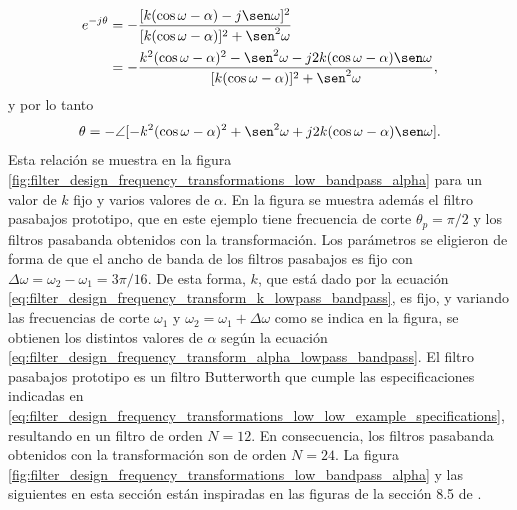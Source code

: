 \documentclass[a4paper]{report}
\begin{document}
\begin{align*}
 e^{-j\theta}&=-\frac{[k(\cos\omega-\alpha)-j\sen\omega]^2}{[k(\cos\omega-\alpha)]^2+\sen^2\omega}\\
  &=-\frac{k^2(\cos\omega-\alpha)^2-\sen^2\omega-j2k(\cos\omega-\alpha)\sen\omega}{[k(\cos\omega-\alpha)]^2+\sen^2\omega},
\end{align*}
y por lo tanto
\[
 \theta=-\angle[-k^2(\cos\omega-\alpha)^2+\sen^2\omega+j2k(\cos\omega-\alpha)\sen\omega].
\]
Esta relación se muestra en la figura \ref{fig:filter_design_frequency_transformations_low_bandpass_alpha} para un valor de \(k\) fijo y varios valores de \(\alpha\). En la figura se muestra además el filtro pasabajos prototipo, que en este ejemplo tiene frecuencia de corte \(\theta_p=\pi/2\) y los filtros pasabanda obtenidos con la transformación. Los parámetros se eligieron de forma de que el ancho de banda de los filtros pasabajos es fijo con \(\Delta\omega=\omega_2-\omega_1=3\pi/16\). De esta forma, \(k\), que está dado por la ecuación \ref{eq:filter_design_frequency_transform_k_lowpass_bandpass}, es fijo, y variando las frecuencias de corte \(\omega_1\) y \(\omega_2=\omega_1+\Delta\omega\) como se indica en la figura, se obtienen los distintos valores de \(\alpha\) según la ecuación \ref{eq:filter_design_frequency_transform_alpha_lowpass_bandpass}. El filtro pasabajos prototipo es un filtro Butterworth que cumple las especificaciones indicadas en \ref{eq:filter_design_frequency_transformations_low_low_example_specifications}, resultando en un filtro de orden \(N=12\). En consecuencia, los filtros pasabanda obtenidos con la transformación son de orden \(N=24\). La figura \ref{fig:filter_design_frequency_transformations_low_bandpass_alpha} y las siguientes en esta sección están inspiradas en las figuras de la sección 8.5 de \cite{holton2021digital}.
\end{document}
